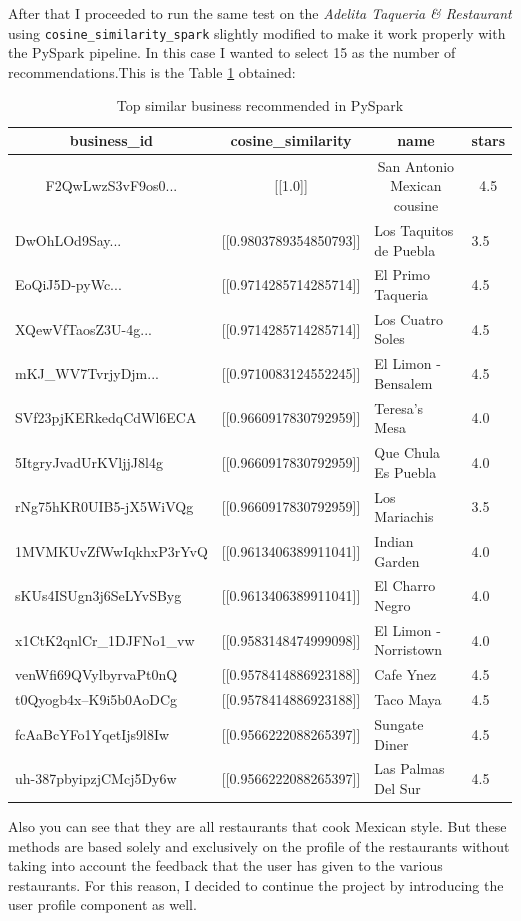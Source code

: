 \documentclass[12pt,english]{report}
\begin{document}
After that I proceeded to run the same test on the \textit{Adelita Taqueria \& Restaurant} using \texttt{cosine\_similarity\_spark} slightly modified to make it work properly with the PySpark pipeline.
In this case I wanted to select 15 as the number of recommendations.This is the Table \ref{tab:topbuspyspark} obtained:\par
\begin{table}[h]
\caption{Top similar business recommended in PySpark}
\label{tab:topbuspyspark}
\begin{tabular}{|l|l|l|l|}
\hline
\multicolumn{1}{|c|}{business\_id}            & \multicolumn{1}{c|}{cosine\_similarity} & \multicolumn{1}{c|}{name}                        & \multicolumn{1}{c|}{stars} \\ \hline
\multicolumn{1}{|c|}{F2QwLwzS3vF9os0...} & \multicolumn{1}{c|}{{[}{[}1.0{]}{]}}    & \multicolumn{1}{c|}{San Antonio Mexican cousine} & \multicolumn{1}{c|}{4.5}   \\ \hline
DwOhLOd9Say...   & {[}{[}0.9803789354850793{]}{]} & Los Taquitos de Puebla & 3.5 \\ \hline
EoQiJ5D-pyWc...  & {[}{[}0.9714285714285714{]}{]} & El Primo Taqueria      & 4.5 \\ \hline
XQewVfTaosZ3U-4g...  & {[}{[}0.9714285714285714{]}{]} & Los Cuatro Soles       & 4.5 \\ \hline
mKJ\_WV7TvrjyDjm... & {[}{[}0.9710083124552245{]}{]} & El Limon - Bensalem    & 4.5 \\ \hline
SVf23pjKERkedqCdWl6ECA   & {[}{[}0.9660917830792959{]}{]} & Teresa's Mesa          & 4.0 \\ \hline
5ItgryJvadUrKVljjJ8l4g   & {[}{[}0.9660917830792959{]}{]} & Que Chula Es Puebla    & 4.0 \\ \hline
rNg75hKR0UIB5-jX5WiVQg   & {[}{[}0.9660917830792959{]}{]} & Los Mariachis          & 3.5 \\ \hline
1MVMKUvZfWwIqkhxP3rYvQ   & {[}{[}0.9613406389911041{]}{]} & Indian Garden          & 4.0 \\ \hline
sKUs4ISUgn3j6SeLYvSByg   & {[}{[}0.9613406389911041{]}{]} & El Charro Negro        & 4.0 \\ \hline
x1CtK2qnlCr\_1DJFNo1\_vw & {[}{[}0.9583148474999098{]}{]} & El Limon - Norristown  & 4.0 \\ \hline
venWfi69QVylbyrvaPt0nQ   & {[}{[}0.9578414886923188{]}{]} & Cafe Ynez              & 4.5 \\ \hline
t0Qyogb4x--K9i5b0AoDCg   & {[}{[}0.9578414886923188{]}{]} & Taco Maya              & 4.5 \\ \hline
fcAaBcYFo1YqetIjs9l8Iw   & {[}{[}0.9566222088265397{]}{]} & Sungate Diner          & 4.5 \\ \hline
uh-387pbyipzjCMcj5Dy6w   & {[}{[}0.9566222088265397{]}{]} & Las Palmas Del Sur     & 4.5 \\ \hline
\end{tabular}
\end{table}
Also you can see that they are all restaurants that cook Mexican style. But these methods are based solely and exclusively on the profile of the restaurants without taking into account the feedback that the user has given to the various restaurants. For this reason, I decided to continue the project by introducing the user profile component as well.
\end{document}
